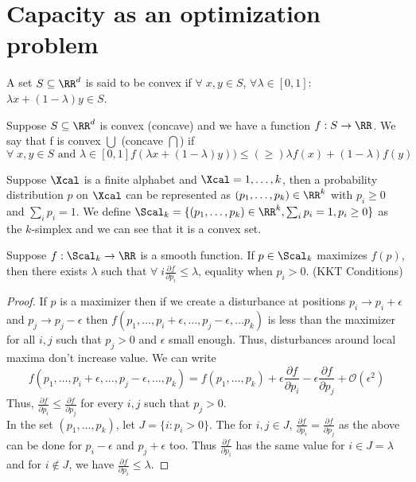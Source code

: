 \section{Capacity as an optimization problem}
\begin{definition}
A set $S \subseteq \RR^d$ is said to be convex if $\forall\;x,y\in S$, $\forall \lambda \in [0,1]$: $\lambda x + (1-\lambda) y \in S$.
\end{definition}
\begin{definition}
    Suppose $S \subseteq \RR^d$ is convex (concave) and we have a function $f: S \to \RR$. We say that f is convex $\bigcup$ (concave $\bigcap$) if
    \[\forall\;x,y\in S \text{ and } \lambda \in [0,1] f(\lambda x + (1-\lambda)y)) \leq (\geq) \lambda f(x) + (1-\lambda)f(y)\]
\end{definition}
\begin{definition}
    Suppose $\Xcal$ is a finite alphabet and $\Xcal = {1,\dots, k}$, then a probability distribution $p$ on $\Xcal$ can be represented as $(p_1, \dots, p_k) \in \RR^k$ with $p_i \geq 0$ and $\sum_i p_i = 1$. We define $\Scal_k = \{(p_1, \dots, p_k) \in \RR^k, \sum_i p_i = 1, p_i \geq 0\}$ as the $k$-simplex and we can see that it is a convex set.
\end{definition}
\begin{theorem}
Suppose $f: \Scal_k \to \RR$ is a smooth function. If $p \in \Scal_k$ maximizes $f(p)$, then there exists $\lambda$ such that $\forall\; i \frac{\partial f}{\partial p_i} \leq \lambda$, equality when $p_i > 0$. (KKT Conditions)
\end{theorem}
\begin{proof}
If $p$ is a maximizer then if we create a disturbance at positions $p_i \to p_i + \epsilon$ and $p_j \to p_j - \epsilon$ then $f(p_1, \dots, p_i +\epsilon, \dots, p_j-\epsilon, \dots p_k)$ is less than the maximizer for all $i,j$ such that $p_j > 0$ and $\epsilon$ small enough. Thus, disturbances around local maxima don't increase value. We can write
\[f(p_1, \dots, p_i+\epsilon, \dots, p_j-\epsilon, \dots, p_k) = f(p_1,\dots,p_k) + \epsilon \frac{\partial f}{\partial p_i} - \epsilon \frac{\partial f}{\partial p_j} + \mathcal{O}(\epsilon^2)\]
Thus, $ \frac{\partial f}{\partial p_i} \leq  \frac{\partial f}{\partial p_j}$ for every $i, j$ such that $p_j > 0$. \\
In the set $(p_1, \dots, p_k)$, let $J = \{i: p_i > 0\}$. The for $i,j \in J$, $ \frac{\partial f}{\partial p_i} =  \frac{\partial f}{\partial p_j}$ as the above can be done for $p_i - \epsilon$ and $p_j + \epsilon$ too. Thus $\frac{\partial f}{\partial p_i}$ has the same value for $i \in J = \lambda$ and for $i \notin J$, we have $\frac{\partial f}{\partial p_i} \leq \lambda$.
\end{proof}
